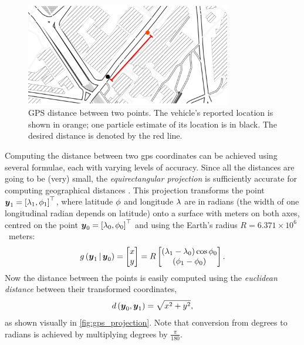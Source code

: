 \begin{knitrout}\small
{}\color{fgcolor}\begin{figure}

{\centering \includegraphics[width=0.8\textwidth]{figure/gps_dist-1} 

}

\caption[GPS distance between two points]{GPS distance between two points. The vehicle's reported location is shown in orange; one particle estimate of its location is in black. The desired distance is denoted by the red line.}\label{fig:gps_dist}
\end{figure}


\end{knitrout}

Computing the distance between two \gls{gps} coordinates can be achieved using several formulae, each with varying levels of accuracy. Since all the distances are going to be (very) small, the \emph{equirectangular projection} is sufficiently accurate for computing geographical distances \citep{Snyder_1998}. This projection transforms the point $\boldsymbol{y}_1 = \left[\lambda_1, \phi_1\right]^\top$, where latitude $\phi$ and longitude $\lambda$ are in radians (the width of one longitudinal radian depends on latitude) onto a surface with meters on both axes, centred on the point $\boldsymbol{y}_0 = \left[\lambda_0, \phi_0\right]^\top$ and using the Earth's radius $R = 6.371 \times 10^6$~meters:
\begin{equation}
\label{eq:equirectangular_projection}
g\left(\boldsymbol{y}_1\,|\,\boldsymbol{y}_0\right) =
\begin{bmatrix} x \\ y \end{bmatrix} =
R \begin{bmatrix}
(\lambda_1 - \lambda_0) \cos \phi_0 \\
(\phi_1 - \phi_0)
\end{bmatrix}.
\end{equation}
Now the distance between the points is easily computed using the \emph{euclidean distance} between their transformed coordinates,
\begin{equation}
\label{eq:obs_dist}
d\left(\boldsymbol{y}_0, \boldsymbol{y}_1\right) = \sqrt{x^2 + y^2},
\end{equation}
as shown visually in \cref{fig:gps_projection}. Note that conversion from degrees to radians is achieved by multiplying degrees by $\frac{\pi}{180}$.

